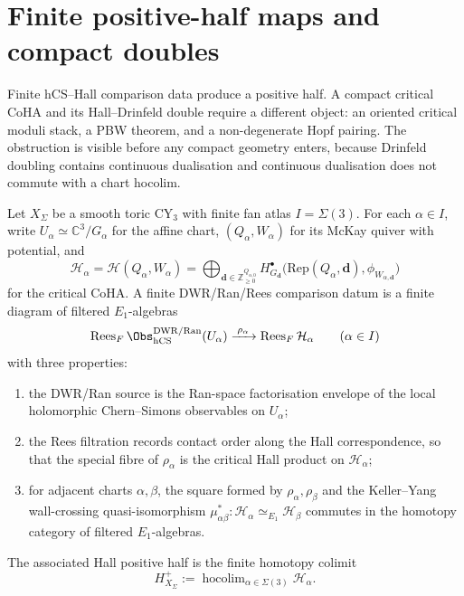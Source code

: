 \section{Finite positive-half maps and compact doubles}
\label{sec:finite-positive-half-compact-double}

Finite hCS--Hall comparison data produce a positive half. A compact
critical CoHA and its Hall--Drinfeld double require a different object:
an oriented critical moduli stack, a PBW theorem, and a non-degenerate
Hopf pairing. The obstruction is visible before any compact geometry
enters, because Drinfeld doubling contains continuous dualisation and
continuous dualisation does not commute with a chart hocolim.

\begin{definition}
\label{def:finite-dwr-ran-rees-comparison}
Let $X_\Sigma$ be a smooth toric CY$_3$ with finite fan atlas
$I=\Sigma(3)$. For each $\alpha\in I$, write
$U_\alpha\simeq \mathbb{C}^3/G_\alpha$ for the affine chart,
$(Q_\alpha,W_\alpha)$ for its McKay quiver with potential, and
\[
 \mathcal{H}_\alpha
 =
 \mathcal{H}(Q_\alpha,W_\alpha)
 =
 \bigoplus_{\mathbf d\in\mathbb{Z}_{\geq0}^{Q_{\alpha,0}}}
 H^\bullet_{G_{\mathbf d}}
 \bigl(\mathrm{Rep}(Q_\alpha,\mathbf d),\phi_{W_{\alpha,\mathbf d}}\bigr)
\]
for the critical CoHA. A finite DWR/Ran/Rees comparison datum is a
finite diagram of filtered $E_1$-algebras
\[
 \operatorname{Rees}_F \Obs^{\mathrm{DWR/Ran}}_{\hCS}(U_\alpha)
 \xrightarrow{\;\rho_\alpha\;}
 \operatorname{Rees}_F \mathcal{H}_\alpha
 \qquad(\alpha\in I)
\]
with three properties:
\begin{enumerate}[label=\textup{(\roman*)}]
\item the DWR/Ran source is the Ran-space factorisation envelope of the
local holomorphic Chern--Simons observables on $U_\alpha$;
\item the Rees filtration records contact order along the Hall
correspondence, so that the special fibre of $\rho_\alpha$ is the
critical Hall product on $\mathcal{H}_\alpha$;
\item for adjacent charts $\alpha,\beta$, the square formed by
$\rho_\alpha,\rho_\beta$ and the Keller--Yang wall-crossing
quasi-isomorphism
$\mu_{\alpha\beta}^*\colon\mathcal{H}_\alpha\simeq_{E_1}\mathcal{H}_\beta$
commutes in the homotopy category of filtered $E_1$-algebras.
\end{enumerate}
The associated Hall positive half is the finite homotopy colimit
\[
 H^+_{X_\Sigma}
 :=
 \operatorname{hocolim}_{\alpha\in\Sigma(3)}\mathcal{H}_\alpha.
\]
\end{definition}

